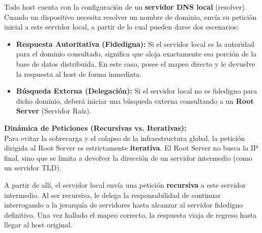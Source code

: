 \begin{tcolorbox}[
    enhanced,
    colback=green!2!white,        %
    colframe=green!50!black,      %
    title=\textbf{Mecanismo de Resolución de Nombres (DNS)},
    fonttitle=\large\sffamily,    %
    coltitle=white,
    boxrule=1.2pt,
    arc=6pt,                      %
    drop shadow=black!15!white,   %
    left=10pt, right=10pt, top=10pt, bottom=10pt
]

Todo host cuenta con la configuración de un \textbf{servidor DNS local} (resolver). Cuando un dispositivo necesita resolver un nombre de dominio, envía su petición inicial a este servidor local, a partir de lo cual pueden darse dos escenarios:

\begin{itemize}[leftmargin=*, label=\textcolor{green!50!black}{\textbullet}]
    \item \textbf{Respuesta Autoritativa (Fidedigna):} Si el servidor local es la autoridad para el dominio consultado, significa que aloja exactamente esa porción de la base de datos distribuida. En este caso, posee el mapeo directo y le devuelve la respuesta al host de forma inmediata.
    
    \item \textbf{Búsqueda Externa (Delegación):} Si el servidor local no es fidedigno para dicho dominio, deberá iniciar una búsqueda externa consultando a un \textbf{Root Server} (Servidor Raíz).
\end{itemize}

\vspace{0.2cm}
\noindent\textbf{Dinámica de Peticiones (Recursivas vs. Iterativas):} \\
Para evitar la sobrecarga y el colapso de la infraestructura global, la petición dirigida al Root Server es estrictamente \textbf{iterativa}. El Root Server no busca la IP final, sino que se limita a devolver la dirección de un servidor intermedio (como un servidor TLD). 

A partir de allí, el servidor local envía una petición \textbf{recursiva} a este servidor intermedio. Al ser recursiva, le delega la responsabilidad de continuar interrogando a la jerarquía de servidores hasta alcanzar al servidor fidedigno definitivo. Una vez hallado el mapeo correcto, la respuesta viaja de regreso hasta llegar al host original.

\end{tcolorbox}

